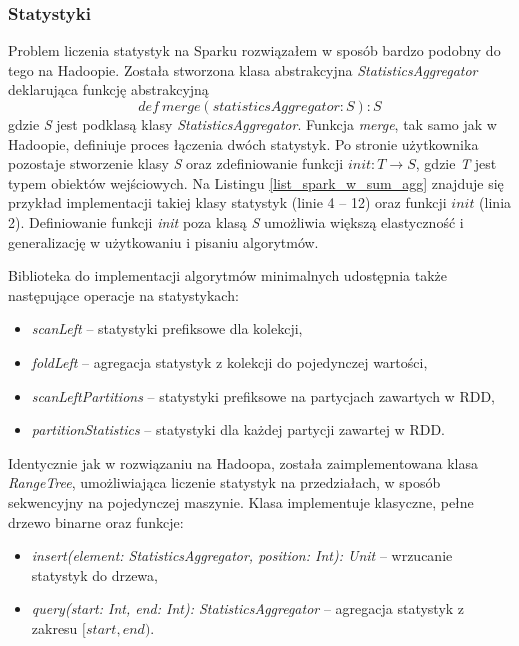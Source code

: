 \documentclass[magisterska]{pracamgr}
\begin{document}
\newpage
\subsubsection{Statystyki} \label{spark_statystyki}

Problem liczenia statystyk na Sparku rozwiązałem w sposób bardzo podobny do tego na Hadoopie. Została stworzona klasa abstrakcyjna \textit{StatisticsAggregator} deklarująca funkcję abstrakcyjną
$$def \ merge(statisticsAggregator: S): S $$ gdzie \textit{S} jest podklasą klasy \textit{StatisticsAggregator}. Funkcja \textit{merge}, tak samo jak w Hadoopie, definiuje proces łączenia dwóch statystyk. Po stronie użytkownika pozostaje stworzenie klasy \textit{S} oraz zdefiniowanie funkcji $init: T \rightarrow S$, gdzie \textit{T} jest typem obiektów wejściowych. Na Listingu \ref{list_spark_w_sum_agg} znajduje się przykład implementacji takiej klasy statystyk (linie 4 -- 12) oraz funkcji \(init\) (linia 2). Definiowanie funkcji \textit{init} poza klasą \textit{S} umożliwia większą elastyczność i generalizację w użytkowaniu i pisaniu algorytmów.

Biblioteka do implementacji algorytmów minimalnych udostępnia także następujące operacje na statystykach:
\begin{itemize}
    \item \textit{scanLeft} -- statystyki prefiksowe dla kolekcji,
    \item \textit{foldLeft} -- agregacja statystyk z kolekcji do pojedynczej wartości,
    \item \textit{scanLeftPartitions} -- statystyki prefiksowe na partycjach zawartych w RDD,
    \item \textit{partitionStatistics} -- statystyki dla każdej partycji zawartej w RDD.
\end{itemize}

Identycznie jak w rozwiązaniu na Hadoopa, została zaimplementowana klasa \textit{RangeTree}, umożliwiająca liczenie statystyk na przedziałach, w sposób sekwencyjny na pojedynczej maszynie. Klasa implementuje klasyczne, pełne drzewo binarne oraz funkcje:
\begin{itemize}
    \item \textit{insert(element: StatisticsAggregator, position: Int): Unit} -- wrzucanie statystyk do drzewa,
    \item \textit{query(start: Int, end: Int): StatisticsAggregator} -- agregacja statystyk z zakresu \([start, end)\).
\end{itemize}
\end{document}
